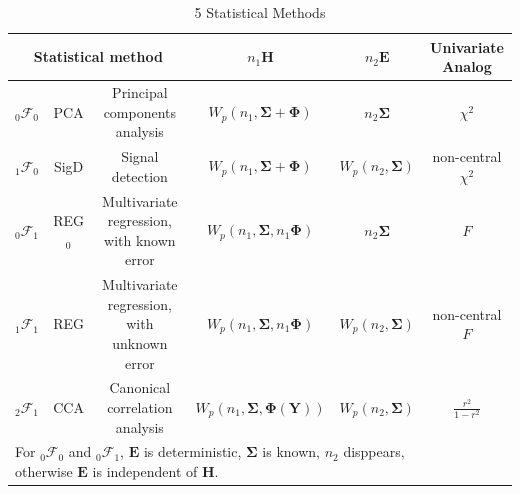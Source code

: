 \documentclass[twoside]{article}
\begin{document}
\begin{table}[ht]
    \caption{5 Statistical Methods}\label{tab:5cases_James}
    \footnotesize
    \begin{center}
      \begin{tabular}{lccccc}
        
        \multicolumn{3}{c}{Statistical method} & $n_1\mathbf{H}$ & $n_2\mathbf{E}$ & Univariate Analog \\
        \hline
        $_{\mathrm{0}}\mathcal{F}_{\mathrm{0}}$ & PCA & Principal components analysis & $W_p(n_1,\boldsymbol{\Sigma+\Phi})$ & $n_2\boldsymbol{\Sigma}$ & $\chi^2$\\
        $_{\mathrm{1}}\mathcal{F}_{\mathrm{0}}$ & SigD & Signal detection & $W_p(n_1,\boldsymbol{\Sigma+\Phi})$ & $W_p(n_2,\boldsymbol{\Sigma})$ & non-central $\chi^2$ \\
        $_{\mathrm{0}}\mathcal{F}_{\mathrm{1}}$ & REG$_0$ & Multivariate regression, with known error & $W_p(n_1,\boldsymbol{\Sigma},n_1\boldsymbol{\Phi})$ & $n_2\boldsymbol{\Sigma}$ & $F$ \\
        $_{\mathrm{1}}\mathcal{F}_{\mathrm{1}}$ & REG & Multivariate regression, with unknown error & $W_p(n_1,\boldsymbol{\Sigma},n_1\boldsymbol{\Phi})$ & $W_p(n_2,\boldsymbol{\Sigma})$ & non-central $F$ \\
        $_{\mathrm{2}}\mathcal{F}_{\mathrm{1}}$ & CCA & Canonical correlation analysis & $W_p(n_1,\boldsymbol{\Sigma},\boldsymbol{\Phi}(\mathbf{Y}))$ & $W_p(n_2,\boldsymbol{\Sigma})$ & $\frac{r^2}{1-r^2}$\\ \hline
        \multicolumn{5}{l}{For $_{\mathrm{0}}\mathcal{F}_{\mathrm{0}}$ and $_{\mathrm{0}}\mathcal{F}_{\mathrm{1}}$, $\mathbf{E}$ is deterministic, $\boldsymbol{\Sigma}$ is known, $n_2$ disppears, otherwise $\mathbf{E}$ is independent of $\mathbf{H}$.}
      \end{tabular}
    \end{center}
\end{table}
\end{document}
